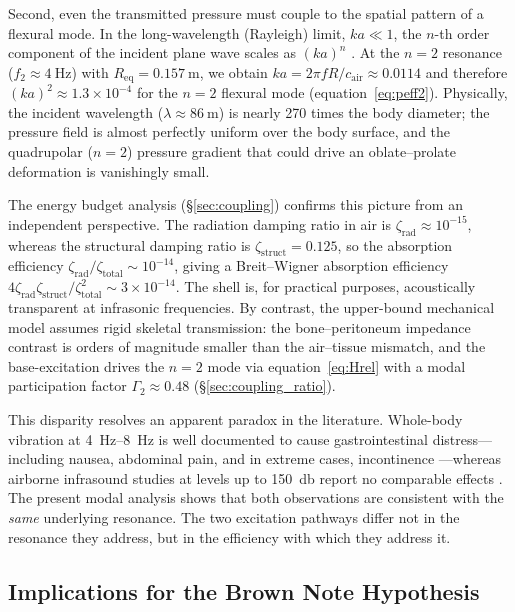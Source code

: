Second, even the transmitted pressure must couple to the spatial pattern of
a flexural mode.  In the long-wavelength (Rayleigh) limit, $ka \ll 1$, the
$n$-th order component of the incident plane wave scales as $(ka)^n$
\cite{Junger1986}.  At the $n{=}2$ resonance
($f_2 \approx \SI{4}{\hertz}$) with
$R_{\mathrm{eq}} = \SI{0.157}{\metre}$, we obtain
$ka = 2\pi f R / c_{\mathrm{air}} \approx 0.0114$ and therefore
$(ka)^2 \approx 1.3 \times 10^{-4}$ for the $n = 2$ flexural mode
(equation~\ref{eq:peff2}).  Physically, the incident wavelength
($\lambda \approx \SI{86}{\metre}$) is nearly 270 times the body diameter;
the pressure field is almost perfectly uniform over the body surface, and
the quadrupolar ($n = 2$) pressure gradient that could drive an
oblate--prolate deformation is vanishingly small.

The energy budget analysis (\S\ref{sec:coupling}) confirms this picture from
an independent perspective.  The radiation damping ratio in air is
$\zeta_{\mathrm{rad}} \approx 10^{-15}$, whereas the structural damping
ratio is $\zeta_{\mathrm{struct}} = 0.125$, so the absorption efficiency
$\zeta_{\mathrm{rad}} / \zeta_{\mathrm{total}} \sim 10^{-14}$, giving a
Breit--Wigner absorption efficiency
$4\zeta_\mathrm{rad}\zeta_\mathrm{struct}/\zeta_\mathrm{total}^2 \sim 3 \times 10^{-14}$.  The shell
is, for practical purposes, acoustically transparent at infrasonic
frequencies.  By contrast, the upper-bound mechanical model assumes rigid
skeletal transmission: the bone--peritoneum impedance contrast is orders of
magnitude smaller than the air--tissue mismatch, and the base-excitation
drives the $n = 2$ mode via equation~\ref{eq:Hrel} with a modal
participation factor $\Gamma_2 \approx 0.48$
(\S\ref{sec:coupling_ratio}).

This disparity resolves an apparent paradox in the literature.  Whole-body
vibration at \SIrange{4}{8}{\hertz} is well documented to cause
gastrointestinal distress---including nausea, abdominal pain, and in
extreme cases, incontinence \cite{Griffin1990,mansfield2005human,Seidel1986,Ishitake2002,Krajnak2018}---whereas
airborne infrasound studies at levels up to \SI{150}{\decibel} report no
comparable effects \cite{Moller2004,Leventhall2007}.  The present modal
analysis shows that both observations are consistent with the \emph{same}
underlying resonance.  The two excitation pathways differ not in the
resonance they address, but in the efficiency with which they address it.

\subsection{Implications for the Brown Note Hypothesis}
\label{sec:disc:brownnote}

